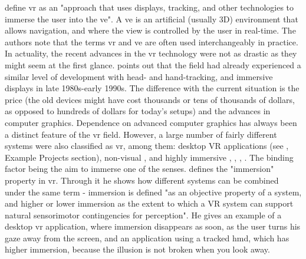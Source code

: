 \parencite{jr_3d_2017} define \gls{vr} as an "approach that uses displays, tracking, and other technologies to immerse the user into the \gls{ve}". A \gls{ve} is an artificial (usually 3D) environment that allows navigation, and where the view is controlled by the user in real-time. The authors note that the terms \gls{vr} and \gls{ve} are often used interchangeably in practice. 
In actuality, the recent advances in the \gls{vr} technology were not as drastic as they might seem at the first glance. \parencite{slater_immersion_2018} points out that the field had already experienced a similar level of development with head- and hand-tracking, and immersive displays in late 1980s-early 1990s. The difference with the current situation is the price (the old devices might have cost thousands or tens of thousands of dollars, as opposed to hundreds of dollars for today's setups) and the advances in computer graphics.
Dependence on advanced computer graphics has always been a distinct feature of the \gls{vr} field. However, a large number of fairly different systems were also classified as \gls{vr}, among them: desktop VR applications (see \parencite{churchill_collaborative_1998}, Example Projects section), non-visual \parencite{ammi_intermodal_2015}, and highly immersive \parencite{davidson_greenspace_1996}, \parencite{greenwald_cocoverse_nodate}, \parencite{lena_real-time_nodate}, \parencite{kulik_virtual_2018}. The binding factor being the aim to immerse one of the senses. \parencite{slater_immersion_2018} defines the "immersion" property in \gls{vr}. Through it he shows how different systems can be combined under the same term - immersion is defined "as an objective property of a system, and higher or lower immersion as the extent to which a VR system can support natural sensorimotor contingencies for perception". He gives an example of a desktop \gls{vr} application, where immersion disappears as soon, as the user turns his gaze away from the screen, and an application using a tracked \gls{hmd}, which has higher immersion, because the illusion is not broken when you look away.



